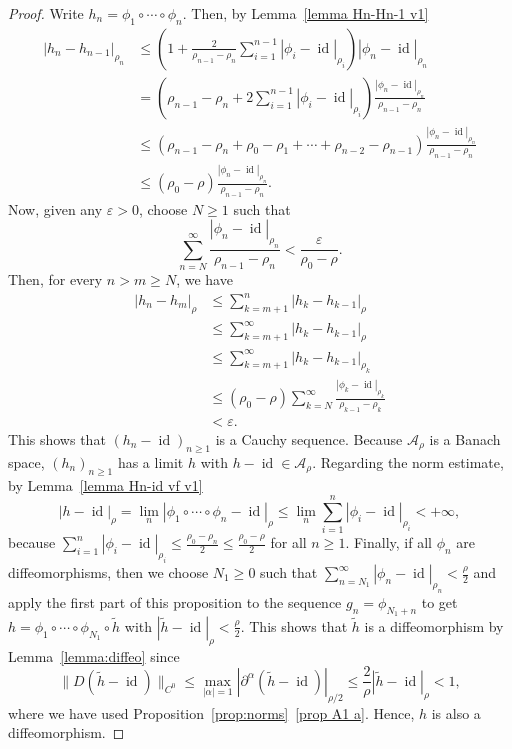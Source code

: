 \documentclass[12pt,reqno,a4paper]{amsart}%
\numberwithin{equation}{section}
\newcommand{\A}{{\mathcal A}}
\newcommand{\id}  {\operatorname{id}}
\begin{document}
\begin{proof}

Write $h_n = \phi_1\circ\cdots\circ \phi_n$. Then, by Lemma~\ref{lemma Hn-Hn-1 v1} 
\begin{align*}
|h_n-h_{n-1}|_{\rho_{n}}
&\leq
\left(1+ 
\frac{2}{\rho_{n-1}-\rho_n}
\sum_{i=1}^{n-1}
|\phi_i-\id|_{\rho_i}
\right)
 |\phi_{n}-\id|_{\rho_n}\\
 & = \left(\rho_{n-1}-\rho_n+ 
2\sum_{i=1}^{n-1}
|\phi_i-\id|_{\rho_i}
\right)
 \frac{|\phi_{n}-\id|_{\rho_n}}{\rho_{n-1}-\rho_n}\\
 &\leq \left(\rho_{n-1}-\rho_n+ \rho_0-\rho_1+\cdots+\rho_{n-2}-\rho_{n-1}
\right)
 \frac{|\phi_{n}-\id|_{\rho_n}}{\rho_{n-1}-\rho_n}\\
 &\leq ( \rho_0 - \rho)
 \frac{|\phi_{n}-\id|_{\rho_n}}{\rho_{n-1}-\rho_n}.
\end{align*}
Now, given any $\varepsilon>0$, choose $N\geq1$ such that 
$$
\sum_{n=N}^\infty \frac{|\phi_{n}-\id|_{\rho_n}}{\rho_{n-1}-\rho_n} <\frac{\varepsilon}{\rho_{0}-\rho}.
$$
Then, for every $ n>m\geq N$, we have
\begin{align*}
|h_n- h_m|_\rho &\leq \sum_{k=m+1}^{n}|h_{k}-h_{k-1}|_\rho\\
&\leq \sum_{k=m+1}^\infty|h_{k}-h_{k-1}|_\rho \\
&\leq \sum_{k=m+1}^\infty|h_{k}-h_{k-1}|_{\rho_{k}} \\
&\leq \left(\rho_{0}-\rho
\right) \sum_{k=N}^\infty \frac{|\phi_{k}-\id|_{\rho_k}}{\rho_{k-1}-\rho_k}\\
& <\varepsilon.
\end{align*}
This shows that $(h_n-\id)_{n\geq1}$ is a Cauchy sequence. Because $\A_\rho$ is a Banach space, $(h_n)_{n\geq1}$ has a limit $h$ with $h-\id\in\A_\rho$.  Regarding the norm estimate, by Lemma~\ref{lemma Hn-id vf v1}
$$
|h-\id|_\rho = \lim_n |\phi_1\circ\cdots\circ \phi_n-\id|_\rho \leq \lim_n \sum_{i=1}^n|\phi_i-\id|_{\rho_i} <+\infty,
$$
because $ \sum_{i=1}^n|\phi_i-\id|_{\rho_i}\leq \frac{\rho_0-\rho_n}{2}\leq \frac{\rho_0-\rho}{2}$ for all $n\geq1$. 
Finally, if all $\phi_n$ are diffeomorphisms, then we choose $N_1\geq0$ such that $\sum_{n=N_1}^\infty |\phi_n-\id|_{\rho_n}<\frac{\rho}{2}$ and apply the first part of this proposition to the sequence $g_n=\phi_{N_1+n}$ to get $h=\phi_1\circ\cdots \circ \phi_{N_1}\circ \tilde{h}$ with $|\tilde{h}-\id|_\rho<\frac{\rho}{2}$. This shows that $\tilde{h}$ is a diffeomorphism  by Lemma~\ref{lemma:diffeo} since
$$
\|D(\tilde{h}-\id)\|_{C^0}
\leq
\max_{|\alpha|=1}|\partial^\alpha (\tilde h-\id)|_{\rho/2}
\leq
\frac{2}{\rho}|\tilde h-\id|_{\rho}<1,
$$
where we have used Proposition~\ref{prop:norms}~\eqref{prop A1 a}.
Hence, $h$ is also a diffeomorphism.
%
%
\end{proof}
\end{document}
